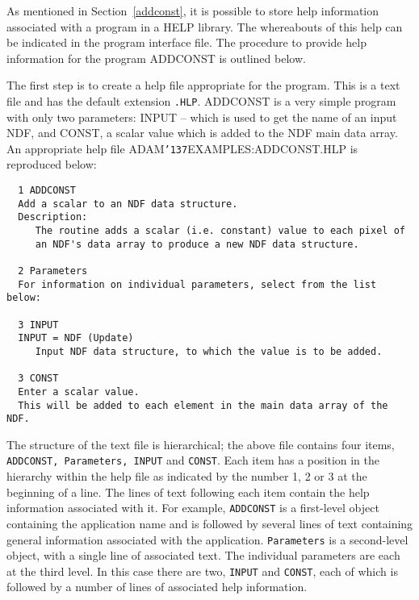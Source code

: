 \documentclass[twoside,11pt]{article}
\renewcommand{\_}{{\tt\char'137}}
\begin{document}
As mentioned in Section~\ref{addconst}, it is possible to store help
information associated with a program in a HELP library.
The whereabouts of this help can be indicated in the program interface file.
The procedure to provide help information for the program 
ADDCONST is outlined below.

The first step is to create a help file appropriate for the  program.
This is a text file and has the default extension {\tt .HLP}.
ADDCONST is a very simple program with only two parameters: INPUT -- which 
is used to  get the name of an input NDF, and CONST,
a scalar value which is added to the NDF main data array.
An appropriate  help file ADAM\_EXAMPLES:ADDCONST.HLP is reproduced below:
\begin{verbatim}
  1 ADDCONST
  Add a scalar to an NDF data structure.
  Description:
     The routine adds a scalar (i.e. constant) value to each pixel of
     an NDF's data array to produce a new NDF data structure.

  2 Parameters
  For information on individual parameters, select from the list below:
 
  3 INPUT
  INPUT = NDF (Update)
     Input NDF data structure, to which the value is to be added.

  3 CONST
  Enter a scalar value.
  This will be added to each element in the main data array of the NDF.
\end{verbatim}
The structure of the text file is hierarchical;
the above file contains four items, {\tt ADDCONST, Parameters, INPUT} and 
{\tt CONST}.
Each item has a position in the hierarchy within the 
help file  as indicated by the number 1, 2 
or 3 at the beginning of a line.
The lines of text following each item contain the help information
associated with it.
For example, {\tt ADDCONST} is a first-level object containing the application name
and is followed by several lines of text containing general information 
associated with the application.
{\tt Parameters} is a second-level object, with a single line of associated text.
The individual parameters are each at the third level. 
In this case there are two, {\tt INPUT} and {\tt CONST}, each of which 
is followed by a number of lines of associated help
information.
\end{document}
